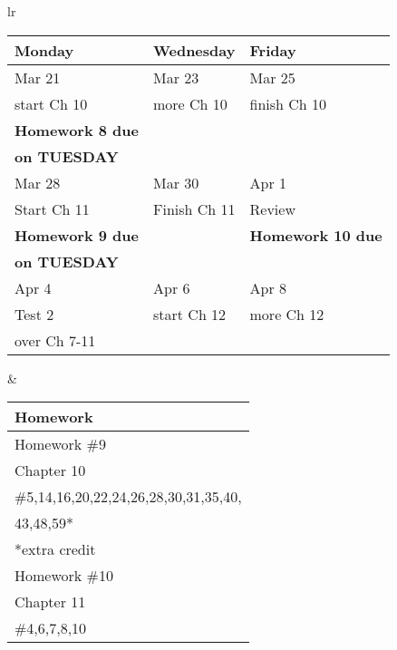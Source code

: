 \documentclass[11pt]{article}
\begin{document}
\newpage
\begin{tabular}{lr}
\begin{tabular}{|l|l|l|}
\hline
Monday & Wednesday & Friday \\
\hline \hline
Mar 21&Mar 23 & Mar 25\\
start Ch 10&more Ch 10&finish Ch 10\\
\textbf{Homework 8 due}&&\\
\textbf{on TUESDAY}&&\\
\hline
Mar 28 & Mar 30 & Apr 1 \\
Start Ch 11 &Finish Ch 11&Review\\
\textbf{Homework 9 due}&&\textbf{Homework 10 due}\\
\textbf{on TUESDAY}&&\\
\hline
Apr 4 & Apr 6 & Apr 8 \\
Test 2 & start Ch 12 & more Ch 12 \\
over Ch 7-11 &&\\
\hline
\end{tabular}
&
\begin{tabular}{|p{6cm}|}
\hline
Homework \\
\hline \hline
Homework \#9\\
Chapter 10\\
\#5,14,16,20,22,24,26,28,30,31,35,40,\\
43,48,59*\\
*extra credit \\
\hline
Homework \#10\\
Chapter 11\\
\#4,6,7,8,10\\
\hline
\end{tabular}
\end{tabular}
\end{document}
